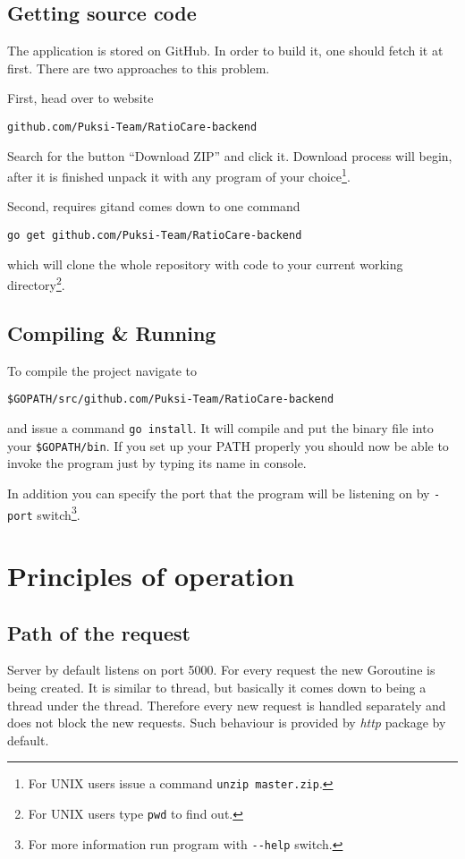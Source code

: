\subsection{Getting source code}
The application is stored on GitHub. In order to build it, one should fetch it at first. There are two approaches to this problem.

First, head over to website
\begin{verbatim}
github.com/Puksi-Team/RatioCare-backend
\end{verbatim}
Search for the button ``Download ZIP'' and click it. Download process will begin, after it is finished unpack it with any program of your choice\cprotect\footnote{For UNIX users issue a command \verb|unzip master.zip|.}.

Second, requires git and comes down to one command
\begin{verbatim}
go get github.com/Puksi-Team/RatioCare-backend
\end{verbatim}
which will clone the whole repository with code to your current working directory\cprotect\footnote{For UNIX users type \verb|pwd| to find out.}.

\subsection{Compiling \& Running}
To compile the project navigate to
\begin{verbatim}
$GOPATH/src/github.com/Puksi-Team/RatioCare-backend
\end{verbatim}
and issue a command \verb|go install|. It will compile and put the binary file into your \verb|$GOPATH/bin|. If you set up your PATH properly you should now be able to invoke the program just by typing its name in console.

In addition you can specify the port that the program will be listening on by \verb|-port| switch\cprotect\footnote{For more information run program with \verb|--help| switch.}.

\section{Principles of operation}

\subsection{Path of the request}
\label{sec:path-of-the-request}
Server by default listens on port 5000. For every request the new Goroutine\cite{Goroutines-go} is being created. It is similar to thread, but basically it comes down to being a thread under the thread. Therefore every new request is handled separately and does not block the new requests. Such behaviour is provided by \textit{http}\cite{HTTP-go} package by default.

